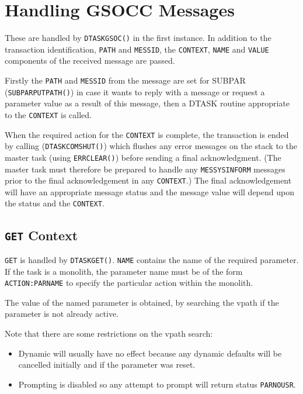 \documentclass[twoside,11pt]{article}
\newcommand{\xref}[3]{#1}
\renewcommand{\_}{\texttt{\symbol{95}}}
\begin{document}
\section{\label{handling_gsocc_messages}Handling GSOCC Messages}
These are handled by \texttt{DTASK\_GSOC()} in the first instance. In addition
to the transaction identification, \texttt{PATH} and \texttt{MESSID}, the
\texttt{CONTEXT}, \texttt{NAME} and \texttt{VALUE} components of the received
message are passed. 

Firstly the \texttt{PATH} and \texttt{MESSID} from the message are set for
SUBPAR (\texttt{SUBPAR\_PUTPATH()}) in case it wants to reply with a message or
request a parameter value as a result of this message, then a DTASK routine
appropriate to the \texttt{CONTEXT} is called.

When the required action for the \texttt{CONTEXT} is complete, the transaction
is ended by calling (\texttt{DTASK\_COMSHUT()}) which flushes any error
messages on the stack to the master task (using 
\xref{\texttt{ERR\_CLEAR()}}{ssn4}{ERR_CLEAR})
before sending a final acknowledgment. 
(The master task must therefore be prepared to handle any
\texttt{MESSYS\_\_INFORM} messages prior to the final acknowledgement in any
\texttt{CONTEXT}.)
The final acknowledgement will have an appropriate message status and the
message value will depend upon the status and the \texttt{CONTEXT}.

\subsection{\label{get_context}\texttt{GET} Context}
\texttt{GET} is handled by \texttt{DTASK\_GET()}.
\texttt{NAME} contains the name of the required parameter. If the task is a 
\xref{monolith}{sun144}{introduction}, the parameter name must be of the form
\texttt{ACTION:PARNAME} to specify the particular action within the monolith.

The value of the named parameter is obtained, by searching the
\xref{vpath}{sun115}{the_vpath_field}
if the parameter is not already active.

Note that there are some restrictions on the vpath search:
\begin{itemize}
\item Dynamic will usually have no effect because any
dynamic defaults will be cancelled initially and if the parameter was reset.
\item Prompting is disabled so any attempt to prompt will return status
\texttt{PAR\_\_NOUSR}.
\end{itemize}
\end{document}
